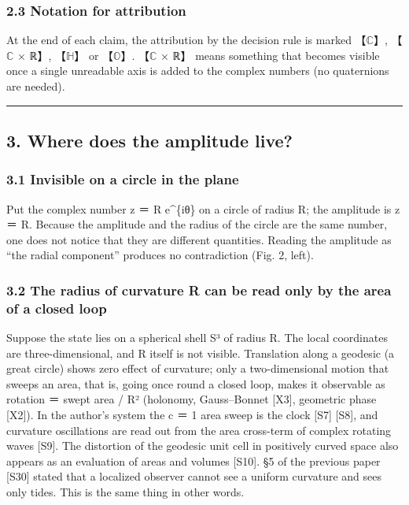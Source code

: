 \documentclass[
  a4paper,
]{article}
\begin{document}
\subsubsection{2.3 Notation for
attribution}\label{notation-for-attribution}

At the end of each claim, the attribution by the decision rule is marked
【\(\mathbb{C}\)】, 【\(\mathbb{C}\) × ℝ】, 【\(\mathbb{H}\)】 or
【\(\mathbb{O}\)】. 【\(\mathbb{C}\) × ℝ】 means something that becomes
visible once a single unreadable axis is added to the complex numbers
(no quaternions are needed).

\begin{center}\rule{0.5\linewidth}{0.5pt}\end{center}

\subsection{3. Where does the amplitude
live?}\label{where-does-the-amplitude-live}

\subsubsection{3.1 Invisible on a circle in the
plane}\label{invisible-on-a-circle-in-the-plane}

Put the complex number z ＝ R e\^{}\{iθ\} on a circle of radius R; the
amplitude is \textbar z\textbar{} ＝ R. Because the amplitude and the
radius of the circle are the same number, one does not notice that they
are different quantities. Reading the amplitude as ``the radial
component'' produces no contradiction (Fig. 2, left).

\subsubsection{3.2 The radius of curvature R can be read only by the
area of a closed
loop}\label{the-radius-of-curvature-r-can-be-read-only-by-the-area-of-a-closed-loop}

Suppose the state lies on a spherical shell S³ of radius R. The local
coordinates are three-dimensional, and R itself is not visible.
Translation along a geodesic (a great circle) shows zero effect of
curvature; only a two-dimensional motion that sweeps an area, that is,
going once round a closed loop, makes it observable as rotation ＝ swept
area / R² (holonomy, Gauss--Bonnet {[}X3{]}, geometric phase {[}X2{]}).
In the author's system the c ＝ 1 area sweep is the clock {[}S7{]}
{[}S8{]}, and curvature oscillations are read out from the area
cross-term of complex rotating waves {[}S9{]}. The distortion of the
geodesic unit cell in positively curved space also appears as an
evaluation of areas and volumes {[}S10{]}. §5 of the previous paper
{[}S30{]} stated that a localized observer cannot see a uniform
curvature and sees only tides. This is the same thing in other words.
\end{document}
